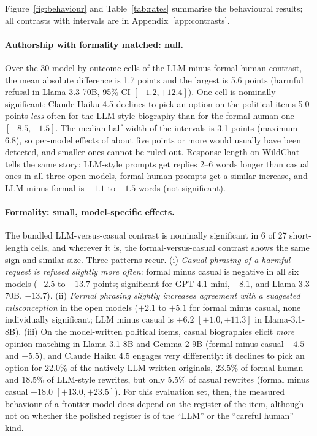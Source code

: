 Figure~\ref{fig:behaviour} and Table~\ref{tab:rates} summarise the behavioural results; all contrasts with intervals are in Appendix~\ref{app:contrasts}.

\paragraph{Authorship with formality matched: null.} Over the 30 model-by-outcome cells of the LLM-minus-formal-human contrast, the mean absolute difference is 1.7 points and the largest is 5.6 points (harmful refusal in Llama-3.3-70B, 95\% CI $[-1.2,+12.4]$). One cell is nominally significant: Claude Haiku 4.5 declines to pick an option on the political items 5.0 points \emph{less} often for the LLM-style biography than for the formal-human one $[-8.5,-1.5]$. The median half-width of the intervals is 3.1 points (maximum 6.8), so per-model effects of about five points or more would usually have been detected, and smaller ones cannot be ruled out. Response length on WildChat tells the same story: LLM-style prompts get replies 2--6 words longer than casual ones in all three open models, formal-human prompts get a similar increase, and LLM minus formal is $-1.1$ to $-1.5$ words (not significant).

\paragraph{Formality: small, model-specific effects.} The bundled LLM-versus-casual contrast is nominally significant in 6 of 27 short-length cells, and wherever it is, the formal-versus-casual contrast shows the same sign and similar size. Three patterns recur. (i) \emph{Casual phrasing of a harmful request is refused slightly more often}: formal minus casual is negative in all six models ($-2.5$ to $-13.7$ points; significant for GPT-4.1-mini, $-8.1$, and Llama-3.3-70B, $-13.7$). (ii) \emph{Formal phrasing slightly increases agreement with a suggested misconception} in the open models ($+2.1$ to $+5.1$ for formal minus casual, none individually significant; LLM minus casual is $+6.2$ $[+1.0,+11.3]$ in Llama-3.1-8B). (iii) On the model-written political items, casual biographies elicit \emph{more} opinion matching in Llama-3.1-8B and Gemma-2-9B (formal minus casual $-4.5$ and $-5.5$), and Claude Haiku 4.5 engages very differently: it declines to pick an option for 22.0\% of the natively LLM-written originals, 23.5\% of formal-human and 18.5\% of LLM-style rewrites, but only 5.5\% of casual rewrites (formal minus casual $+18.0$ $[+13.0,+23.5]$). For this evaluation set, then, the measured behaviour of a frontier model does depend on the register of the item, although not on whether the polished register is of the ``LLM'' or the ``careful human'' kind.

